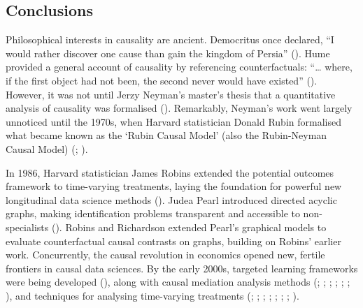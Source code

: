 \documentclass[
  single column]{article}
\begin{document}
\subsection{Conclusions}\label{id-sec-5}

Philosophical interests in causality are ancient. Democritus once
declared, ``I would rather discover one cause than gain the kingdom of
Persia'' (). Hume
provided a general account of causality by referencing counterfactuals:
``\ldots{} where, if the first object had not been, the second never
would have existed'' (). However, it
was not until Jerzy Neyman's master's thesis that a quantitative
analysis of causality was formalised
(). Remarkably, Neyman's
work went largely unnoticed until the 1970s, when Harvard statistician
Donald Rubin formalised what became known as the `Rubin Causal Model'
(also the Rubin-Neyman Causal Model) (; ).

In 1986, Harvard statistician James Robins extended the potential
outcomes framework to time-varying treatments, laying the foundation for
powerful new longitudinal data science methods
(). Judea Pearl introduced
directed acyclic graphs, making identification problems transparent and
accessible to non-specialists ().
Robins and Richardson extended Pearl's graphical models to evaluate
counterfactual causal contrasts on graphs, building on Robins' earlier
work. Concurrently, the causal revolution in economics opened new,
fertile frontiers in causal data sciences. By the early 2000s, targeted
learning frameworks were being developed
(), along with
causal mediation analysis methods (; ;
;
;
;
;
), and
techniques for analysing time-varying treatments
(;
;
;
;
;
;
;
).
\end{document}
